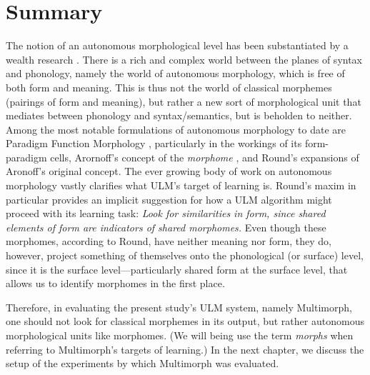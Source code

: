 \section{Summary}\label{sum}
The notion of an autonomous morphological level
has been substantiated by a wealth research \citep[including, e.g.,][]{stump:2001, aronoff:1994, round:2011, round:2015}.
There is a rich and complex 
world between the planes of syntax and phonology, namely the world of autonomous morphology, which is free of both form and meaning. This is thus not the world of classical morphemes (pairings of form and meaning), but rather a new sort of morphological unit that mediates between phonology and
syntax/semantics, but is beholden to neither.  
Among the most notable formulations of autonomous morphology to date are Paradigm Function Morphology \citep{stump:2001}, particularly in the workings of its form-paradigm cells, Arornoff's
concept of the \emph{morphome} \citep{aronoff:1994}, and Round's expansions \citep[e.g.,][]{round:2011,round:2015} of Aronoff's original concept. The ever growing body of work on autonomous morphology vastly clarifies what ULM's target of learning is. Round's maxim in particular provides an implicit suggestion for how a ULM algorithm might proceed with its learning task: \textit{Look for similarities in form, since shared elements of form are indicators of shared morphomes.} Even though these morphomes, according to Round, have neither meaning nor form, they do, however, project something of themselves onto the phonological (or surface) level, since it is the surface level---particularly shared  form at the surface level, that allows us to identify morphomes in the first place. 

Therefore, in evaluating the present study's ULM system, namely Multimorph, one should not look for classical morphemes in its output, but rather autonomous morphological units like morphomes. (We will being use the term \emph{morphs} when referring to Multimorph's targets of learning.)
In the next chapter, we discuss the setup of the experiments by which Multimorph was evaluated.